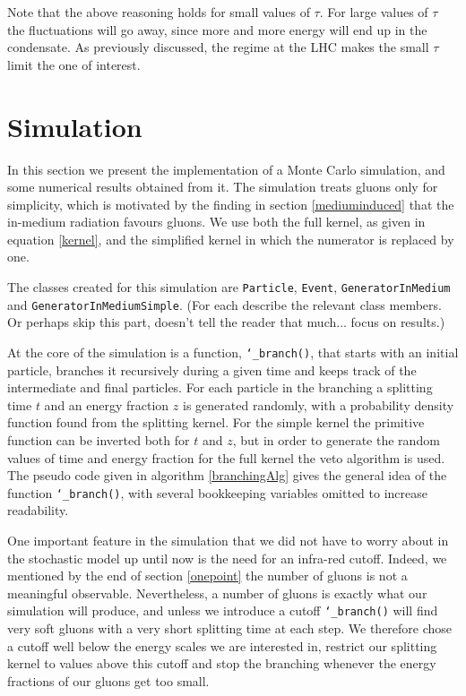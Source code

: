 \documentclass[a4paper,12pt]{article}
\numberwithin{equation}{section}
\begin{document}
Note that the above reasoning holds for small values of $\tau$. For large values of $\tau$ the fluctuations will go away, since more and more energy will end up in the condensate. As previously discussed, the regime at the LHC makes the small $\tau$ limit the one of interest.


\section{Simulation}
In this section we present the implementation of a Monte Carlo simulation, and some numerical results obtained from it. The simulation treats gluons only for simplicity, which is motivated by the finding in section \ref{mediuminduced} that the in-medium radiation favours gluons. We use both the full kernel, as given in equation \eqref{kernel}, and the simplified kernel in which the numerator is replaced by one. 



The classes created for this simulation are {\tt Particle}, {\tt Event}, {\tt GeneratorInMedium} and {\tt GeneratorInMediumSimple}. (For each describe the relevant class members. Or perhaps skip this part, doesn't tell the reader that much... focus on results.)





At the core of the simulation is a function, {\tt \char`_branch()}, that starts with an initial particle, branches it recursively during a given time and keeps track of the intermediate and final particles. For each particle in the branching a splitting time $t$ and an energy fraction $z$ is generated randomly, with a probability density function found from the splitting kernel. For the simple kernel the primitive function can be inverted both for $t$ and $z$, but in order to generate the random values of time and energy fraction for the full kernel the veto algorithm is used.
The pseudo code given in algorithm \ref{branchingAlg} gives the general idea of the function {\tt \char`_branch()}, with several bookkeeping variables omitted to increase readability.


One important feature in the simulation that we did not have to worry about in the stochastic model up until now is the need for an infra-red cutoff. Indeed, we mentioned by the end of section \ref{onepoint} the number of gluons is not a meaningful observable. Nevertheless, a number of gluons is exactly what our simulation will produce, and unless we introduce a cutoff {\tt \char`_branch()} will find very soft gluons with a very short splitting time at each step. We therefore chose a cutoff well below the energy scales we are interested in, restrict our splitting kernel to values above this cutoff and stop the branching whenever the energy fractions of our gluons get too small.
\end{document}
